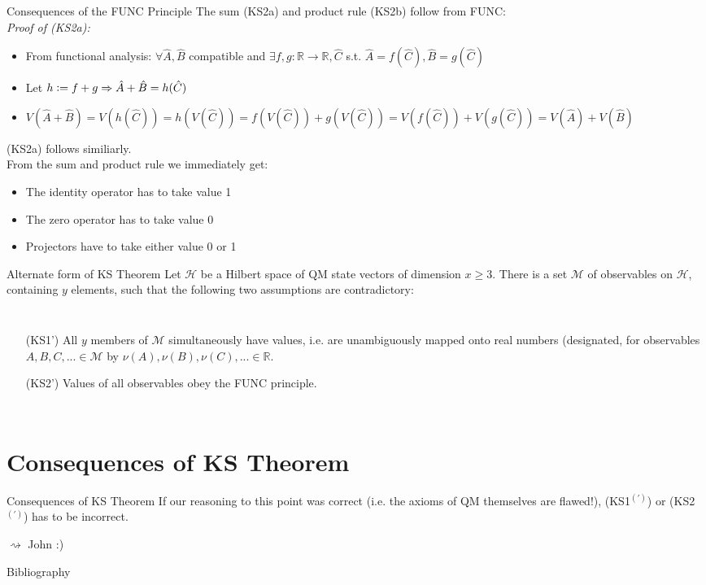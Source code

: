 \documentclass{beamer}
\newcommand{\defeq}{\vcentcolon=}
\newcommand{\R}{\mathbb{R}}
\begin{document}
\begin{frame}[allowframebreaks]{Consequences of the FUNC Principle}
The sum (KS2a) and product rule (KS2b) follow from FUNC:\\
\vfill
\textit{Proof of (KS2a):}

\begin{itemize}
\item From functional analysis: $\forall\hat A,\hat B$ compatible and $\exists f,g:\R\rightarrow\R,\hat C$ s.t. $\hat A=f(\hat C),\hat B=g(\hat C)$
\item Let $h\defeq f+g\Rightarrow \hat A+\hat B=h(\hat C)$
\item $V(\hat A+\hat B)=V(h(\hat C))=h(V(\hat C))=f(V(\hat C))+g(V(\hat C))=V(f(\hat C))+V(g(\hat C))=V(\hat A)+V(\hat B)$
\end{itemize}
\vfill
(KS2a) follows similiarly.\\
\framebreak
From the sum and product rule we immediately get:
\begin{itemize}
\item The identity operator has to take value 1
\item The zero operator has to take value 0
\item Projectors have to take either value 0 or 1
\end{itemize}
\framebreak
\begin{block}{Alternate form of KS Theorem}
Let $\mathcal{H}$ be a Hilbert space of QM state vectors of dimension $x\geq3$. There is a set $\mathcal M$ of observables on $\mathcal{H}$, containing $y$ elements, such that the following two assumptions are contradictory: 
  \begin{columns}
\begin{itemize}
\item [(KS1')] All $y$ members of $\mathcal M$ simultaneously have values, i.e. are unambiguously mapped onto real numbers (designated, for observables $A,B,C,...\in\mathcal M$ by $\nu(A),\nu(B),\nu(C),...\in\mathbb{R}$.
\item [(KS2')] Values of all observables obey the FUNC principle.
\end{itemize}
  \end{columns}
\end{block}
\end{frame}
\section{Consequences of KS Theorem}
\begin{frame}{Consequences of KS Theorem}
If our reasoning to this point was correct (i.e. the axioms of QM themselves are flawed!), (KS1$^{(')}$) or (KS2$^{(')}$) has to be incorrect.
\vfill
{\Huge
\begin{center}
$\rightsquigarrow$ John :)
\end{center}
}

\end{frame}






\begin{frame}[allowframebreaks]{Bibliography}
\printbibliography
\end{frame}
\end{document}
